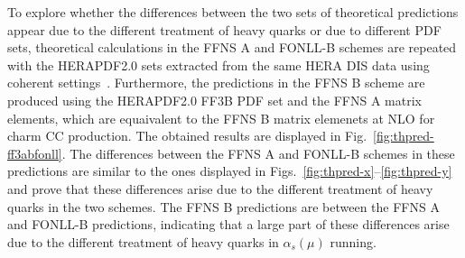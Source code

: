 \documentclass[pdftex,twocolumn,epjc3]{svjour3}          %
\newcommand{\fonll} {{FONLL-B}\xspace}
\newcommand{\ffns} {{FFNS A}\xspace}
\newcommand{\ffnsb} {{FFNS B}\xspace}
\newcommand{\ffthreeb} {{HERAPDF2.0 FF3B}\xspace}
\begin{document}
{\color{red}
To explore whether the differences between the two sets of theoretical predictions appear due to the different treatment of heavy quarks or due to different PDF sets, theoretical calculations in the \ffns and \fonll schemes are repeated with the HERAPDF2.0 sets extracted from the same HERA DIS data using coherent settings~\cite{Abramowicz:2015mha}. Furthermore, the predictions in the \ffnsb scheme are produced using the \ffthreeb PDF set and the \ffns matrix elements, which are equaivalent to the \ffnsb matrix elemenets at NLO for charm CC production. The obtained results are displayed in Fig.~\ref{fig:thpred-ff3abfonll}. The differences between the \ffns and \fonll schemes in these predictions are similar to the ones displayed in Figs.~\ref{fig:thpred-x}--\ref{fig:thpred-y} and prove that these differences arise due to the different treatment of heavy quarks in the two schemes. The \ffnsb predictions are between the \ffns and \fonll predictions, indicating that a large part of these differences arise due to the different treatment of heavy quarks in $\alpha_s(\mu)$ running.

}
\end{document}
